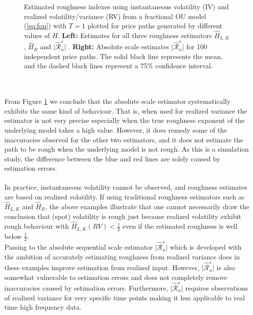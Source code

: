 \documentclass{article}
\begin{document}
\begin{figure}[htbp]
    \caption{Estimated roughness indexes using instantaneous volatility (IV) and realized volatility/variance (RV) from a fractional OU model (\ref{eq:fou}) with $T=1$ plotted for price paths generated by different values of $H$. \textbf{Left:} Estimates for all three roughness estimators $\widehat{H}_{L,K}$, $\widehat{H}_R$ and $\lvert \widehat{\mathscr{R}}_n^s\rvert$ . \textbf{Right:} Absolute scale estimates $\lvert \widehat{\mathscr{R}}_n^s\rvert$ for 100 independent price paths. The solid black line represents the mean, and the dashed black lines represent a 75\% confidence interval.}
    \label{fig:ex7singleincl_scale}
\end{figure}\\\\
From Figure \ref{fig:ex7singleincl_scale} we conclude that the absolute scale estimator systematically exhibits the same kind of behaviour. That is, when used for realized variance the estimator is not very precise especially when the true roughness exponent of the underlying model takes a high value. However, it does remedy some of the inaccuracies observed for the other two estimators, and it does not estimate the path to be rough when the underlying model is not rough. As this is a simulation study, the difference between the blue and red lines are solely caused by estimation errors. \\\\
In practice, instantaneous volatility cannot be observed, and roughness estimates are based on realized volatility. If using traditional roughness estimators such as $\widehat{H}_{L,K}$ and $\widehat{H}_R$, the above examples illustrate that one cannot necessarily draw the conclusion that (spot) volatility is rough just because realized volatility exhibit rough behaviour with $\hat{H}_{L,K}(RV)<\frac{1}{2}$ even if the estimated roughness is well below $\frac{1}{2}$.\\
Passing to the absolute sequential scale estimator $\lvert \widehat{\mathscr{R}}_n^s\rvert$ which is developed with the ambition of accurately estimating roughness from realized variance does in these examples improve estimation from realized input. However, $\lvert \widehat{\mathscr{R}}_n^s\rvert$ is also somewhat vulnerable to estimation errors and does not completely remove inaccuracies caused by estimation errors. Furthermore, $\lvert \widehat{\mathscr{R}}_n^s\rvert$ requires observations of realized variance for very specific time points making it less applicable to real time high frequency data. 
\end{document}
